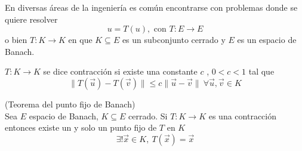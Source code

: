 En diversas \'areas de la ingenier\'ia es com\'un encontrarse con problemas donde se quiere resolver
$$u=T(u),\text{ con } T:E\to E$$ 
o bien $T:K\to K$ en que $K\subseteq E$ es un subconjunto cerrado y $E$ es un espacio de Banach.

\begin{definicion}
$T:K\to K$ se dice contracci\'on si existe una constante $c$ , $0<c<1$ tal que 
$$\|T(\vec{u})-T(\vec{v})\|\leq c\|\vec{u}-\vec{v}\|\:\forall \vec{u},\vec{v}\in K$$
\end{definicion}

\begin{teorema}{\rm (Teorema del punto fijo de Banach)}\label{puntofijodebanach}
\\Sea $E$ espacio de Banach, $K\subseteq E$ cerrado. Si $T:K\to K$ es una contracci\'on entonces existe un y solo un punto fijo de $T$ en $K$
$$\exists ! \vec{x}\in K,\: T(\vec{x})=\vec{x}$$
\end{teorema}

